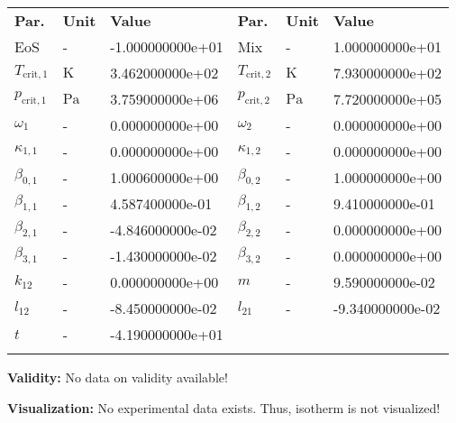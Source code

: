 \begin{longtable}[l]{lll|lll}
\toprule
\addlinespace
\textbf{Par.} & \textbf{Unit} & \textbf{Value} &	\textbf{Par.} & \textbf{Unit} & \textbf{Value} \\
\addlinespace
\midrule
\endhead

\bottomrule
\endfoot
\bottomrule
\endlastfoot
\addlinespace

EoS & - & -1.000000000e+01 & Mix & - & 1.000000000e+01 \\
$T_\mathrm{crit,1}$ & $\si{\kelvin}$ & 3.462000000e+02 & $T_\mathrm{crit,2}$ & $\si{\kelvin}$ & 7.930000000e+02 \\
$p_\mathrm{crit,1}$ & $\si{\pascal}$ & 3.759000000e+06 & $p_\mathrm{crit,2}$ & $\si{\pascal}$ & 7.720000000e+05 \\
$\omega_{1}$ & - & 0.000000000e+00 & $\omega_{2}$ & - & 0.000000000e+00 \\
$\kappa_{1,1}$ & - & 0.000000000e+00 & $\kappa_{1,2}$ & - & 0.000000000e+00 \\
$\beta_{0,1}$ & - & 1.000600000e+00 & $\beta_{0,2}$ & - & 1.000000000e+00 \\
$\beta_{1,1}$ & - & 4.587400000e-01 & $\beta_{1,2}$ & - & 9.410000000e-01 \\
$\beta_{2,1}$ & - & -4.846000000e-02 & $\beta_{2,2}$ & - & 0.000000000e+00 \\
$\beta_{3,1}$ & - & -1.430000000e-02 & $\beta_{3,2}$ & - & 0.000000000e+00 \\
$k_{12}$ & - & 0.000000000e+00 & $m$ & - & 9.590000000e-02 \\
$l_{12}$ & - & -8.450000000e-02 & $l_{21}$ & - & -9.340000000e-02 \\
$t$ & - & -4.190000000e+01 & & & \\

\addlinespace\end{longtable}

\textbf{Validity:}
\newline
No data on validity available!
\newline

\textbf{Visualization:}
%
\newline
No experimental data exists. Thus, isotherm is not visualized!
%

\FloatBarrier
\newpage
